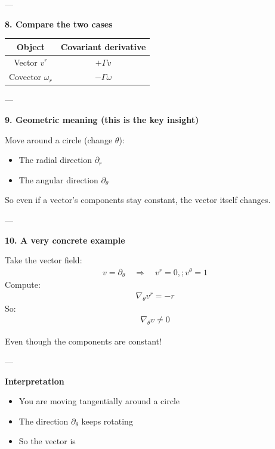 \documentclass[12pt,a4paper]{report}
\begin{document}
\begin{description}
\begin{description}
---

\item \textbf{8. Compare the two cases}

\begin{tabular}{|c|c|}
\hline
 Object               & Covariant derivative  \\ 
\hline
 Vector $v^r$         & $+\Gamma v$           \\
 Covector $\omega_r$  & $-\Gamma \omega$      \\
\hline
\end{tabular}


---

\item \textbf{9. Geometric meaning (this is the key insight)}

Move around a circle (change $\theta$):

\begin{itemize}
\item The radial direction $\partial_r$ 
\item The angular direction $\partial_\theta$ 
\end{itemize}

So even if a vector’s components stay constant, the vector itself changes.


---

\item \textbf{10. A very concrete example}

Take the vector field:
\begin{align*}
v = \partial_\theta
\quad \Rightarrow \quad v^r = 0,; v^\theta = 1
\end{align*}
Compute:
\begin{align*}
\nabla_\theta v^r = -r
\end{align*}
So:
\begin{align*}
\nabla_\theta v \neq 0
\end{align*}

Even though the components are constant!

---

\textbf{Interpretation}

\begin{itemize}
\item You are moving tangentially around a circle
\item The direction $\partial_\theta$ keeps rotating
\item So the vector is 
\end{itemize}


\end{description}
\end{description}
\end{document}
